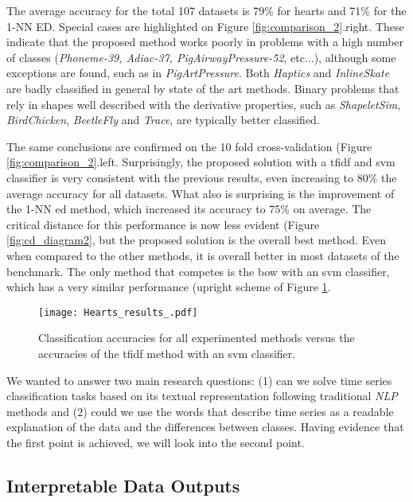 The average accuracy for the total 107 datasets is 79\% for \gls{hearts} and 71\% for the 1-NN ED. Special cases are highlighted on Figure \ref{fig:comparison_2}.right. These indicate that the proposed method works poorly in problems with a high number of classes (\textit{Phoneme-39, Adiac-37, PigAirwayPressure-52}, etc...), although some exceptions are found, such as in \textit{PigArtPressure}. Both \textit{Haptics} and \textit{InlineSkate} are badly classified in general by state of the art methods. Binary problems that rely in shapes well described with the derivative properties, such as \textit{ShapeletSim}, \textit{BirdChicken}, \textit{BeetleFly} and \textit{Trace}, are typically better classified.
\par
The same conclusions are confirmed on the 10 fold cross-validation (Figure \ref{fig:comparison_2}.left. Surprisingly, the proposed solution with a \gls{tfidf} and \gls{svm} classifier is very consistent with the previous results, even increasing to 80\% the average accuracy for all datasets. What also is surprising is the improvement of the 1-NN \gls{ed} method, which increased its accuracy to 75\% on average. The critical distance for this performance is now less evident (Figure \ref{fig:cd_diagram2}, but the proposed solution is the overall best method. Even when compared to the other methods, it is overall better in most datasets of the benchmark. The only method that competes is the \gls{bow} with an \gls{svm} classifier, which has a very similar performance (upright scheme of Figure \ref{fig:comparison_1}. 

\begin{figure}[h]
    \centering
    \texttt{[image: Hearts\_results\_.pdf]}
    \caption{Classification accuracies for all experimented methods versus the accuracies of the \gls{tfidf} method with an \gls{svm} classifier.}
    \label{fig:comparison_1}
\end{figure}

We wanted to answer two main research questions: (1) can we solve time series classification tasks based on its textual representation following traditional \textit{NLP} methods and (2) could we use the words that describe time series as a readable explanation of the data and the differences between classes. Having evidence that the first point is achieved, we will look into the second point.

\subsection{Interpretable Data Outputs}

